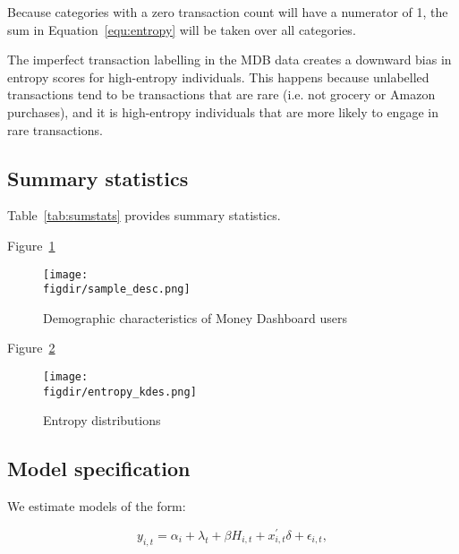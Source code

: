 Because categories with a zero transaction count will have a numerator of 1,
the sum in Equation~\ref{equ:entropy} will be taken over all categories.

The imperfect transaction labelling in the MDB data creates a downward bias in
entropy scores for high-entropy individuals. This happens because unlabelled
transactions tend to be transactions that are rare (i.e. not grocery or Amazon
purchases), and it is high-entropy individuals that are more likely to engage
in rare transactions.


\subsection{Summary statistics}%
\label{par:summary_statistics}

Table~\ref{tab:sumstats} provides summary statistics.



Figure~\ref{fig:sample_desc}
\begin{figure}[H]
    \caption{Demographic characteristics of Money Dashboard users}
    \label{fig:sample_desc}
    \begin{center}
        \texttt{[image: \\figdir/sample\_desc.png]}
    \end{center}
\end{figure}

Figure~\ref{fig:entropy_kdes}
\begin{figure}[H]
    \center \newcommand\width{\textwidth} \caption{Entropy distributions}
    \label{fig:entropy_kdes}
    \texttt{[image: \\figdir/entropy\_kdes.png]}
    \fignote{\width}{}
\end{figure}


\subsection{Model specification}%
\label{par:model_specification}

We estimate models of the form: 

\begin{equation}
    y_{i,t} = \alpha_i + \lambda_t + \beta H_{i,t} + x^\prime_{i,t} \delta +
    \epsilon_{i,t},
\end{equation}

